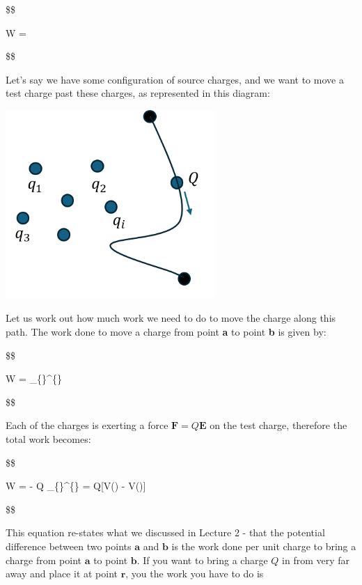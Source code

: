 \documentclass[
  letterpaper,
  DIV=11,
  numbers=noendperiod]{scrreprt}
\begin{document}
\$\$

W = \int {} \cdot {}  

\$\$

Let's say we have some configuration of source charges, and we want to
move a test charge past these charges, as represented in this diagram:

\includegraphics[width=3.125in,height=\textheight]{Figures/workdone_charge.png}

Let us work out how much work we need to do to move the charge along
this path. The work done to move a charge from point \textbf{a} to point
\textbf{b} is given by:

\$\$

W = \int\_\{\}\^{}\{\}
 \cdot {}  

\$\$

Each of the charges is exerting a force
\(\mathrm{\mathbf{F}}= Q \mathrm{\mathbf{E}}\) on the test charge,
therefore the total work becomes:

\$\$

W = - Q \int\_\{\}\^{}\{\}
 \cdot {}  =
Q{[}V() - V(){]}

\$\$

This equation re-states what we discussed in Lecture 2 - that the
potential difference between two points \(\mathrm{\mathbf{a}}\) and
\(\mathrm{\mathbf{b}}\) is the work done per unit charge to bring a
charge from point \(\mathrm{\mathbf{a}}\) to point
\(\mathrm{\mathbf{b}}\). If you want to bring a charge \(Q\) in from
very far away and place it at point \(\mathrm{\mathbf{r}}\), you the
work you have to do is
\end{document}
